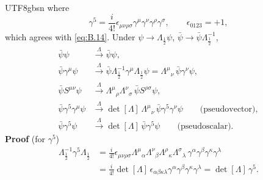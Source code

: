 \documentclass[11pt,a4paper,oneside]{report}
\begin{document}
\begin{CJK*}{UTF8}{gbsn}
where
\begin{equation*}
\gamma^5=\frac{i}{4!}\epsilon_{\mu\nu\rho\sigma}\gamma^\mu\gamma^\nu\gamma^\rho\gamma^\sigma,
\qquad \epsilon_{0123}=+1,
\tag{1.133}\label{eq:1.133}
\end{equation*}
which agrees with \eqref{eq:B.14}. Under $\psi\to\Lambda_{\frac12}\psi$, $\bar\psi\to\bar\psi\Lambda_{\frac12}^{-1}$,
\begin{equation*}
\begin{aligned}
\bar\psi\psi&\xrightarrow{\ \Lambda\ }\bar\psi\psi,\\
\bar\psi\gamma^\mu\psi&\xrightarrow{\ \Lambda\ }\bar\psi\Lambda_{\frac12}^{-1}\gamma^\mu\Lambda_{\frac12}\psi=\Lambda^\mu{}_\nu\,\bar\psi\gamma^\nu\psi,\\
\bar\psi S^{\mu\nu}\psi&\xrightarrow{\ \Lambda\ }\Lambda^\mu{}_\rho\Lambda^\nu{}_\sigma\,\bar\psi S^{\rho\sigma}\psi,\\
\bar\psi\gamma^5\gamma^\mu\psi&\xrightarrow{\ \Lambda\ }\det[\Lambda]\,\Lambda^\mu{}_\nu\,\bar\psi\gamma^5\gamma^\nu\psi\qquad\text{(pseudovector)},\\
\bar\psi\gamma^5\psi&\xrightarrow{\ \Lambda\ }\det[\Lambda]\,\bar\psi\gamma^5\psi\qquad\text{(pseudoscalar)}.
\end{aligned}
\tag{1.134}\label{eq:1.134}
\end{equation*}
\textbf{\boldmath Proof} (for $\gamma^5$)
\begin{equation*}
\begin{aligned}
\Lambda_{\frac12}^{-1}\gamma^5\Lambda_{\frac12}
&=\frac{i}{4!}\epsilon_{\mu\nu\rho\sigma}\Lambda^\mu{}_\alpha\Lambda^\nu{}_\beta\Lambda^\rho{}_\kappa\Lambda^\sigma{}_\lambda\,\gamma^\alpha\gamma^\beta\gamma^\kappa\gamma^\lambda\\
&=\frac{i}{4!}\det[\Lambda]\,\epsilon_{\alpha\beta\kappa\lambda}\gamma^\alpha\gamma^\beta\gamma^\kappa\gamma^\lambda
=\det[\Lambda]\,\gamma^5.
\end{aligned}
\tag{1.135}\label{eq:1.135}
\end{equation*}


\end{CJK*}
\end{document}
